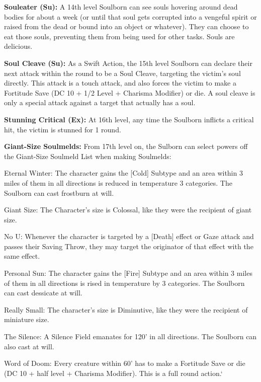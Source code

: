 \textbf{Souleater (Su):} A 14th level Soulborn can see souls hovering around dead bodies for about a week (or until that soul gets corrupted into a vengeful spirit or raised from the dead or bound into an object or whatever). They can choose to eat those souls, preventing them from being used for other tasks. Souls are delicious.

\textbf{Soul Cleave (Su):} As a Swift Action, the 15th level Soulborn can declare their next attack within the round to be a Soul Cleave, targeting the victim's soul directly. This attack is a touch attack, and also forces the victim to make a Fortitude Save (DC 10 + 1/2 Level + Charisma Modifier) or die. A soul cleave is only a special attack against a target that actually has a soul.

\textbf{Stunning Critical (Ex):} At 16th level, any time the Soulborn inflicts a critical hit, the victim is stunned for 1 round.

\textbf{Giant-Size Soulmelds:} From 17th level on, the Sulborn can select powers off the Giant-Size Soulmeld List when making Soulmelds:
\begin{description*}
\item[Eternal Winter:] The character gains the [Cold] Subtype and an area within 3 miles of them in all directions is reduced in temperature 3 categories. The Soulborn can cast frostburn at will.
\item[Giant Size:] The Character's size is Colossal, like they were the recipient of giant size.
\item[No U:] Whenever the character is targeted by a [Death] effect or Gaze attack and passes their Saving Throw, they may target the originator of that effect with the same effect.
\item[Personal Sun:] The character gains the [Fire] Subtype and an area within 3 miles of them in all directions is rised in temperature by 3 categories. The Soulborn can cast dessicate at will.
\item[Really Small:] The character's size is Diminutive, like they were the recipient of miniature size.
\item[The Silence:] A Silence Field emanates for 120' in all directions. The Soulborn can also cast  at will.
\item[Word of Doom:] Every creature within 60' has to make a Fortitude Save or die (DC 10 + half level + Charisma Modifier). This is a full round action.`
\end{description*}

